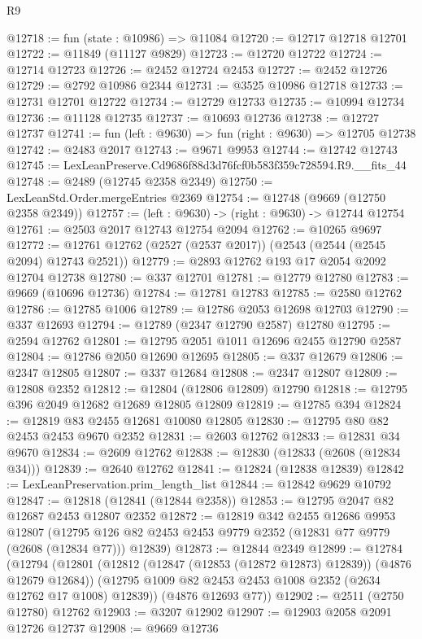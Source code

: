 \begin{lexlean}{R9}
\begin{coremodule}
@12718 := fun (state : @10986) => @11084
@12720 := @12717 @12718 @12701
@12722 := @11849 (@11127 @9829)
@12723 := @12720 @12722
@12724 := @12714 @12723
@12726 := @2452 @12724 @2453
@12727 := @2452 @12726
@12729 := @2792 @10986 @2344
@12731 := @3525 @10986 @12718
@12733 := @12731 @12701 @12722
@12734 := @12729 @12733
@12735 := @10994 @12734
@12736 := @11128 @12735
@12737 := @10693 @12736
@12738 := @12727 @12737
@12741 := fun (left : @9630) => fun (right : @9630) => @12705 @12738
@12742 := @2483 @2017
@12743 := @9671 @9953
@12744 := @12742 @12743
@12745 := LexLeanPreserve.Cd9686f88d3d76fcf0b583f359c728594.R9.__fits_44
@12748 := @2489 (@12745 @2358 @2349)
@12750 := LexLeanStd.Order.mergeEntries @2369
@12754 := @12748 (@9669 (@12750 @2358 @2349))
@12757 := (left : @9630) -> (right : @9630) -> @12744 @12754
@12761 := @2503 @2017 @12743 @12754 @2094
@12762 := @10265 @9697
@12772 := @12761 @12762 (@2527 (@2537 @2017)) (@2543 (@2544 (@2545 @2094) @12743 @2521))
@12779 := @2893 @12762 @193 @17 @2054 @2092 @12704 @12738
@12780 := @337 @12701
@12781 := @12779 @12780
@12783 := @9669 (@10696 @12736)
@12784 := @12781 @12783
@12785 := @2580 @12762
@12786 := @12785 @1006
@12789 := @12786 @2053 @12698 @12703
@12790 := @337 @12693
@12794 := @12789 (@2347 @12790 @2587) @12780
@12795 := @2594 @12762
@12801 := @12795 @2051 @1011 @12696 @2455 @12790 @2587
@12804 := @12786 @2050 @12690 @12695
@12805 := @337 @12679
@12806 := @2347 @12805
@12807 := @337 @12684
@12808 := @2347 @12807
@12809 := @12808 @2352
@12812 := @12804 (@12806 @12809) @12790
@12818 := @12795 @396 @2049 @12682 @12689 @12805 @12809
@12819 := @12785 @394
@12824 := @12819 @83 @2455 @12681 @10080 @12805
@12830 := @12795 @80 @82 @2453 @2453 @9670 @2352
@12831 := @2603 @12762
@12833 := @12831 @34 @9670
@12834 := @2609 @12762
@12838 := @12830 (@12833 (@2608 (@12834 @34)))
@12839 := @2640 @12762
@12841 := @12824 (@12838 @12839)
@12842 := LexLeanPreservation.prim_length_list
@12844 := @12842 @9629 @10792
@12847 := @12818 (@12841 (@12844 @2358))
@12853 := @12795 @2047 @82 @12687 @2453 @12807 @2352
@12872 := @12819
    @342
    @2455
    @12686
    @9953
    @12807
    (@12795 @126 @82 @2453 @2453 @9779 @2352 (@12831 @77 @9779 (@2608 (@12834 @77))) @12839)
@12873 := @12844 @2349
@12899 := @12784
    (@12794
      (@12801
        (@12812 (@12847 (@12853 (@12872 @12873) @12839)) (@4876 @12679 @12684))
        (@12795 @1009 @82 @2453 @2453 @1008 @2352 (@2634 @12762 @17 @1008) @12839))
      (@4876 @12693 @77))
@12902 := @2511 (@2750 @12780) @12762
@12903 := @3207 @12902
@12907 := @12903 @2058 @2091 @12726 @12737
@12908 := @9669 @12736

\end{coremodule}
\end{lexlean}
